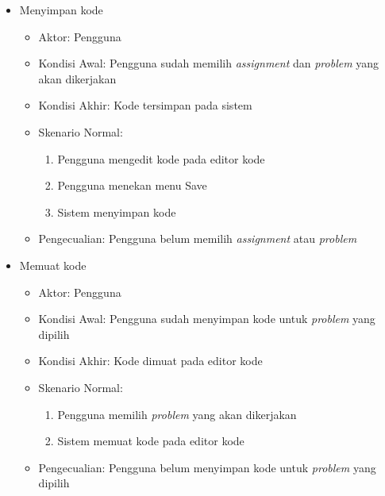 \begin{itemize}
    \item Menyimpan kode
            \begin{itemize}
            \item Aktor: Pengguna
            \item Kondisi Awal: Pengguna sudah memilih \textit{assignment} dan \textit{problem} yang akan dikerjakan
            \item Kondisi Akhir: Kode tersimpan pada sistem
            \item Skenario Normal:
                \begin{enumerate}
                    \item Pengguna mengedit kode pada editor kode
                    \item Pengguna menekan menu Save
                    \item Sistem menyimpan kode
                \end{enumerate}
            \item Pengecualian: Pengguna belum memilih \textit{assignment} atau \textit{problem}
        \end{itemize}
        
    \item Memuat kode
        \begin{itemize}
            \item Aktor: Pengguna
            \item Kondisi Awal: Pengguna sudah menyimpan kode untuk \textit{problem} yang dipilih
            \item Kondisi Akhir: Kode dimuat pada editor kode
            \item Skenario Normal:
                \begin{enumerate}
                    \item Pengguna memilih \textit{problem} yang akan dikerjakan
                    \item Sistem memuat kode pada editor kode
                \end{enumerate}
            \item Pengecualian: Pengguna belum menyimpan kode untuk \textit{problem} yang dipilih
        \end{itemize}
    

\end{itemize}
